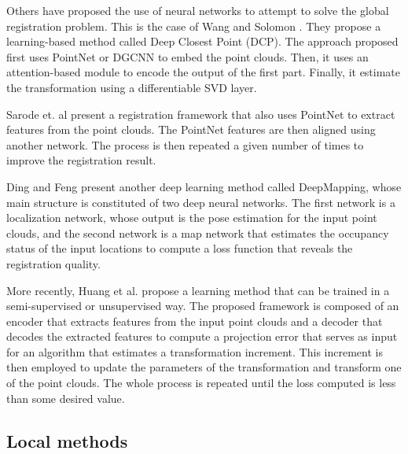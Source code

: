         Others have proposed the use of neural networks to attempt to solve the global registration problem.
        This is the case of Wang and Solomon \cite{Wang_2019_deepclosest}. They propose a learning-based method called Deep Closest Point (DCP).
        The approach proposed first uses PointNet \cite{Qi_2017_pointnetdeep} or DGCNN \cite{Wang_2019_dynamic} to embed the point clouds.
        Then, it uses an attention-based module to encode the output of the first part.
        Finally, it estimate the transformation using a differentiable SVD layer.

        Sarode et. al \cite{Sarode_2019_oneframework} present a registration framework that also uses PointNet to extract features from the point clouds.
        The PointNet features are then aligned using another network. The process is then repeated a given number of times to improve the registration result.
        
        Ding and Feng \cite{Ding_2019_deepmapping} present another deep learning method called DeepMapping,
        whose main structure is constituted of two deep neural networks.
        The first network is a localization network, whose output is the pose estimation for the input point clouds,
        and the second network is a map network that estimates the occupancy status of the input locations to compute a loss function that reveals
        the registration quality.

        More recently, Huang et al. \cite{Huang_2020_feature} propose a learning method that can be trained in a semi-supervised or unsupervised way.
        The proposed framework is composed of an encoder that extracts features from the input point clouds
        and a decoder that decodes the extracted features to compute a projection error that serves as input for an algorithm that estimates
        a transformation increment. 
        This increment is then employed to update the parameters of the transformation and transform one of the point clouds.
        The whole process is repeated until the loss computed is less than some desired value.

        \subsection{Local methods}

